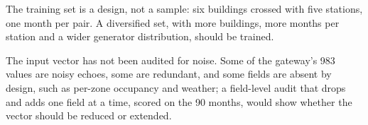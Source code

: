 \documentclass{article}
\begin{document}
The training set is a design, not a sample: six buildings crossed with five stations, one month per pair. A diversified set, with more buildings, more months per station and a wider generator distribution, should be trained.

The input vector has not been audited for noise. Some of the gateway's 983 values are noisy echoes, some are redundant, and some fields are absent by design, such as per-zone occupancy and weather; a field-level audit that drops and adds one field at a time, scored on the 90 months, would show whether the vector should be reduced or extended.
\end{document}
